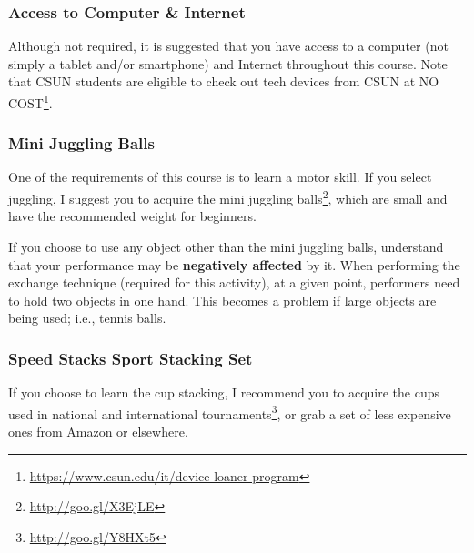 \documentclass[
  letterpaper,
  DIV=11,
  numbers=noendperiod,
  oneside]{scrartcl}
\DeclareRobustCommand{\href}[2]{#2\footnote{\url{#1}}}
\begin{document}
\hypertarget{access-to-computer-internet}{%
\subsubsection{Access to Computer \&
Internet}\label{access-to-computer-internet}}

Although not required, it is suggested that you have access to a
computer (not simply a tablet and/or smartphone) and Internet throughout
this course. Note that CSUN students are eligible to
\href{https://www.csun.edu/it/device-loaner-program}{check out tech
devices from CSUN at NO COST}.

\hypertarget{mini-juggling-balls}{%
\subsubsection{Mini Juggling Balls}\label{mini-juggling-balls}}

One of the requirements of this course is to learn a motor skill. If you
select juggling, I suggest you to acquire the
\href{http://goo.gl/X3EjLE}{mini juggling balls}, which are small and
have the recommended weight for beginners.

\begin{tcolorbox}[enhanced jigsaw, breakable, colbacktitle=quarto-callout-important-color!10!white, colframe=quarto-callout-important-color-frame, opacitybacktitle=0.6, title=\textcolor{quarto-callout-important-color}{\faExclamation}\hspace{0.5em}{Important}, opacityback=0, colback=white, bottomrule=.15mm, toprule=.15mm, left=2mm, rightrule=.15mm, toptitle=1mm, titlerule=0mm, arc=.35mm, bottomtitle=1mm, leftrule=.75mm, coltitle=black]
If you choose to use any object other than the mini juggling balls,
understand that your performance may be \textbf{negatively affected} by
it. When performing the exchange technique (required for this activity),
at a given point, performers need to hold two objects in one hand. This
becomes a problem if large objects are being used; i.e., tennis balls.
\end{tcolorbox}

\hypertarget{speed-stacks-sport-stacking-set}{%
\subsubsection{Speed Stacks Sport Stacking
Set}\label{speed-stacks-sport-stacking-set}}

If you choose to learn the cup stacking, I recommend you to acquire the
\href{http://goo.gl/Y8HXt5}{cups used in national and international
tournaments}, or grab a set of less expensive ones from Amazon or
elsewhere.
\end{document}
